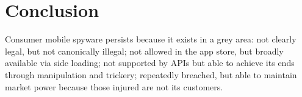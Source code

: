\documentclass[sigconf,balance=false]{acmart}
\newcommand{\alex}[1]{\textcolor{chicagomaroon}{\noindent[AL: #1]}}
\newcommand{\alex}[1]{}
\begin{document}






\section{Conclusion}
Consumer mobile spyware persists because it exists in a grey area: not
clearly legal, but not canonically illegal; not allowed in the app
store, but broadly available via side loading; not supported by APIs
but able to achieve its ends through manipulation and trickery;
repeatedly breached, but able to maintain market power because those
injured are not its customers.
\end{document}
